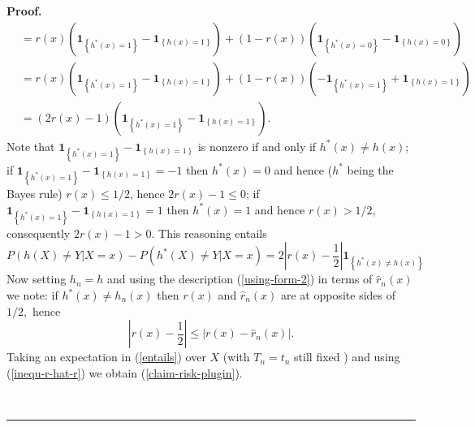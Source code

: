 \documentclass[11pt,twoside]{article}%
\theoremstyle{change}
\newenvironment{proof}[1][Proof]{\textbf{#1.} }{\ \rule{0.5em}{0.5em}}
\begin{document}
\begin{proof}
\begin{align*}
& =r(x)\left(  \mathbf{1}_{\left\{  h^{\ast}(x)=1\right\}  }-\mathbf{1}%
_{\left\{  h(x)=1\right\}  }\right)  +\left(  1-r(x)\right)  \left(
\mathbf{1}_{\left\{  h^{\ast}(x)=0\right\}  }-\mathbf{1}_{\left\{
h(x)=0\right\}  }\right) \\
& =r(x)\left(  \mathbf{1}_{\left\{  h^{\ast}(x)=1\right\}  }-\mathbf{1}%
_{\left\{  h(x)=1\right\}  }\right)  +\left(  1-r(x)\right)  \left(
-\mathbf{1}_{\left\{  h^{\ast}(x)=1\right\}  }+\mathbf{1}_{\left\{
h(x)=1\right\}  }\right) \\
& =\left(  2r(x)-1\right)  \left(  \mathbf{1}_{\left\{  h^{\ast}(x)=1\right\}
}-\mathbf{1}_{\left\{  h(x)=1\right\}  }\right)  .
\end{align*}
Note that $\mathbf{1}_{\left\{  h^{\ast}(x)=1\right\}  }-\mathbf{1}_{\left\{
h(x)=1\right\}  }$ is nonzero if and only if $h^{\ast}(x)\neq h(x)$; if
$\mathbf{1}_{\left\{  h^{\ast}(x)=1\right\}  }-\mathbf{1}_{\left\{
h(x)=1\right\}  }=-1$ then $h^{\ast}(x)=0$ and hence ($h^{\ast}$ being the
Bayes rule) $r(x)\leq1/2$, hence $2r(x)-1\leq0$; if $\mathbf{1}_{\left\{
h^{\ast}(x)=1\right\}  }-\mathbf{1}_{\left\{  h(x)=1\right\}  }=1$ then
$h^{\ast}(x)=1$ and hence $r(x)>1/2$, consequently $2r(x)-1>0$. This reasoning
entails
\begin{equation}
P\left(  h(X)\neq Y|X=x\right)  -P\left(  h^{\ast}(X)\neq Y|X=x\right)
=2\left\vert r(x)-\frac{1}{2}\right\vert \mathbf{1}_{\left\{  h^{\ast}(x)\neq
h(x)\right\}  }\label{entails}%
\end{equation}
Now setting $h_{n}=h$ and using the description (\ref{using-form-2}) in terms
of $\hat{r}_{n}(x)$ we note: if $h^{\ast}(x)\neq h_{n}(x)$ then $r(x)$ and
$\hat{r}_{n}(x)$ are at opposite sides of $1/2,$ hence
\begin{equation}
\left\vert r(x)-\frac{1}{2}\right\vert \leq\left\vert r(x)-\hat{r}%
_{n}(x)\right\vert .\label{inequ-r-hat-r}%
\end{equation}
Taking an expectation in (\ref{entails}) over $X$ (with $T_{n}=t_{n}$ still
fixed ) and using (\ref{inequ-r-hat-r}) we obtain (\ref{claim-risk-plugin}).


\end{proof}
\end{document}
